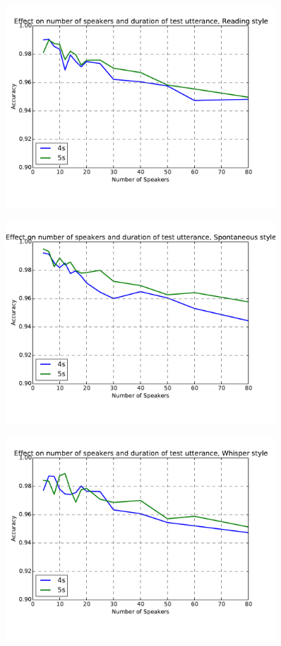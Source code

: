 \begin{figure}[H]
  \centering
  \includegraphics[width=0.9\textwidth]{img/reading.pdf}
\end{figure}
\begin{figure}[H]
  \centering
  \includegraphics[width=0.9\textwidth]{img/spont.pdf}
\end{figure}

\begin{figure}[H]
  \centering
  \includegraphics[width=0.9\textwidth]{img/whisper.pdf}
\end{figure}
